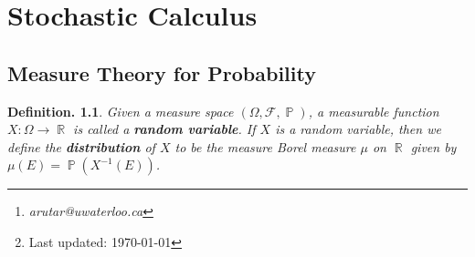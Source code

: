 \documentclass[11pt, a4paper]{memoir}
\title{\subject}
\author{Alex Rutar\thanks{\itshape arutar@uwaterloo.ca}\\ University of Waterloo}
\date{\semester\thanks{Last updated: \today}}
\DeclareMathOperator{\R}{{\mathbb{R}}}
\theoremstyle{change}
\theoremstyle{plain}
\theoremstyle{nonumberplain}
\newtheorem{definition}{Definition.}
\DeclareMathOperator{\pr}{{\mathbb{P}}}
\newcommand{\defn}[1]{{\boldmath\bfseries #1}}
\newcommand{\TODO}[1]{[\textit{\textbf{TODO: #1}}]}
\numberwithin{equation}{section}
\begin{document}
\hypersetup{pageanchor=false}
\maketitle
\newpage
\frontmatter
\hypersetup{pageanchor=true}
\tableofcontents*
\newpage
\mainmatter


\chapter{Stochastic Calculus}
\section{Measure Theory for Probability}

\begin{definition}
    Given a measure space $(\Omega,\mathcal{F},\pr)$, a measurable function $X:\Omega\to\R$ is called a \defn{random variable}.
    If $X$ is a random variable, then we define the \defn{distribution} of $X$ to be the measure Borel measure $\mu$ on $\R$ given by $\mu(E)=\pr(X^{-1}(E))$.
\end{definition}
\end{document}
